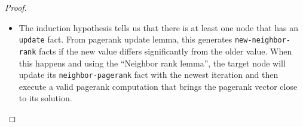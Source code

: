 \begin{proof}
\begin{itemize}
   \item The induction hypothesis tells us that there is at least one node that
   has an \texttt{update} fact. From pagerank update lemma, this
   generates \texttt{new-neighbor-rank} facts if the new value differs
   significantly from the older value. When this happens and using the ``Neighbor
   rank lemma'', the target node will update its \texttt{neighbor-pagerank} fact
   with the newest iteration and then execute a valid pagerank computation that
   brings the pagerank vector close to its solution.

\end{itemize}

\end{proof}

